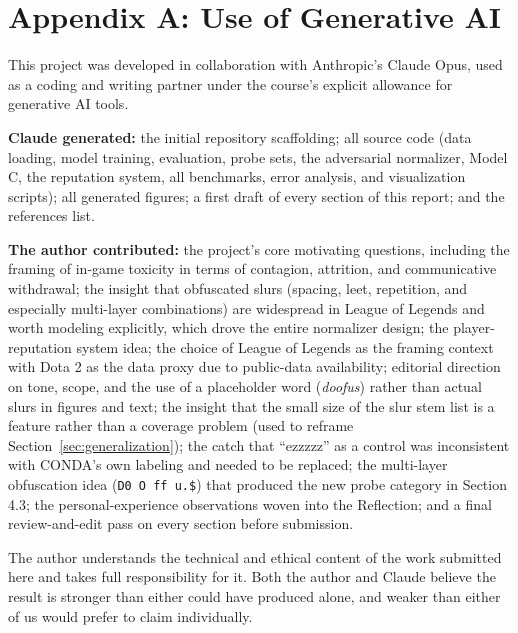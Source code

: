 \documentclass[11pt,twocolumn,letterpaper]{article}
\begin{document}
\appendix

\section*{Appendix A: Use of Generative AI}

This project was developed in collaboration with Anthropic's Claude Opus, used as a coding and writing partner under the course's explicit allowance for generative AI tools.

\textbf{Claude generated:} the initial repository scaffolding; all source code (data loading, model training, evaluation, probe sets, the adversarial normalizer, Model C, the reputation system, all benchmarks, error analysis, and visualization scripts); all generated figures; a first draft of every section of this report; and the references list.

\textbf{The author contributed:} the project's core motivating questions, including the framing of in-game toxicity in terms of contagion, attrition, and communicative withdrawal; the insight that obfuscated slurs (spacing, leet, repetition, and especially multi-layer combinations) are widespread in League of Legends and worth modeling explicitly, which drove the entire normalizer design; the player-reputation system idea; the choice of League of Legends as the framing context with Dota 2 as the data proxy due to public-data availability; editorial direction on tone, scope, and the use of a placeholder word (\textit{doofus}) rather than actual slurs in figures and text; the insight that the small size of the slur stem list is a feature rather than a coverage problem (used to reframe Section~\ref{sec:generalization}); the catch that ``ezzzzz'' as a control was inconsistent with CONDA's own labeling and needed to be replaced; the multi-layer obfuscation idea (\texttt{D0 O ff u.\$}) that produced the new probe category in Section 4.3; the personal-experience observations woven into the Reflection; and a final review-and-edit pass on every section before submission.

The author understands the technical and ethical content of the work submitted here and takes full responsibility for it. Both the author and Claude believe the result is stronger than either could have produced alone, and weaker than either of us would prefer to claim individually.
\end{document}

